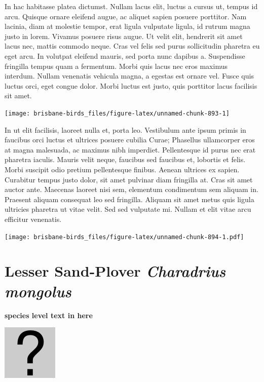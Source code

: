 \documentclass[]{book}
\let\origfigure\figure
\let\endorigfigure\endfigure
\renewenvironment{figure}[1][2] {
  \expandafter\origfigure\expandafter[H]
} {
  \endorigfigure
}
\begin{document}
In hac habitasse platea dictumst. Nullam lacus elit, luctus a cursus ut,
tempus id arcu. Quisque ornare eleifend augue, ac aliquet sapien posuere
porttitor. Nam lacinia, diam at molestie tempor, erat ligula vulputate
ligula, id rutrum magna justo in lorem. Vivamus posuere risus augue. Ut
velit elit, hendrerit sit amet lacus nec, mattis commodo neque. Cras vel
felis sed purus sollicitudin pharetra eu eget arcu. In volutpat eleifend
mauris, sed porta nunc dapibus a. Suspendisse fringilla tempus quam a
fermentum. Morbi quis lacus nec eros maximus interdum. Nullam venenatis
vehicula magna, a egestas est ornare vel. Fusce quis luctus orci, eget
congue dolor. Morbi luctus est justo, quis porttitor lacus facilisis sit
amet.

\begin{figure}
\texttt{[image: brisbane-birds\_files/figure-latex/unnamed-chunk-893-1]} \caption{insert figure caption}\label{fig:unnamed-chunk-893}
\end{figure}

In ut elit facilisis, laoreet nulla et, porta leo. Vestibulum ante ipsum
primis in faucibus orci luctus et ultrices posuere cubilia Curae;
Phasellus ullamcorper eros at magna malesuada, ac maximus nibh
imperdiet. Pellentesque id purus nec erat pharetra iaculis. Mauris velit
neque, faucibus sed faucibus et, lobortis et felis. Morbi suscipit odio
pretium pellentesque finibus. Aenean ultrices ex sapien. Curabitur
tempus justo dolor, sit amet pulvinar diam fringilla at. Cras sit amet
auctor ante. Maecenas laoreet nisi sem, elementum condimentum sem
aliquam in. Praesent aliquam consequat leo sed fringilla. Aliquam sit
amet metus quis ligula ultricies pharetra ut vitae velit. Sed sed
vulputate mi. Nullam et elit vitae arcu efficitur venenatis.

\begin{figure}
\centering
\texttt{[image: brisbane-birds\_files/figure-latex/unnamed-chunk-894-1.pdf]}
\caption{\label{fig:unnamed-chunk-894}insert figure caption}
\end{figure}

\section{\texorpdfstring{Lesser Sand-Plover \emph{Charadrius
mongolus}}{Lesser Sand-Plover Charadrius mongolus}}\label{lesser-sand-plover-charadrius-mongolus}

\textbf{species level text in here}

\begin{figure}
\centering
\includegraphics{assets/missing.png}
\caption{No image for species}
\end{figure}
\end{document}
